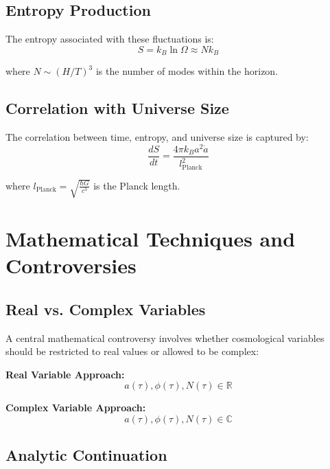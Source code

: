 \documentclass[12pt,a4paper]{article}
\begin{document}
\subsection{Entropy Production}

The entropy associated with these fluctuations is:
\begin{equation}
S = k_B \ln \Omega \approx N k_B
\end{equation}

where $N \sim (H/T)^3$ is the number of modes within the horizon.

\subsection{Correlation with Universe Size}

The correlation between time, entropy, and universe size is captured by:
\begin{equation}
\frac{dS}{dt} = \frac{4\pi k_B a^2 \dot{a}}{l_{\text{Planck}}^2}
\end{equation}

where $l_{\text{Planck}} = \sqrt{\frac{\hbar G}{c^3}}$ is the Planck length.

\section{Mathematical Techniques and Controversies}

\subsection{Real vs. Complex Variables}

A central mathematical controversy involves whether cosmological variables should be restricted to real values or allowed to be complex:

\textbf{Real Variable Approach:}
\begin{equation}
a(\tau), \phi(\tau), N(\tau) \in \mathbb{R}
\end{equation}

\textbf{Complex Variable Approach:}
\begin{equation}
a(\tau), \phi(\tau), N(\tau) \in \mathbb{C}
\end{equation}

\subsection{Analytic Continuation}
\end{document}
